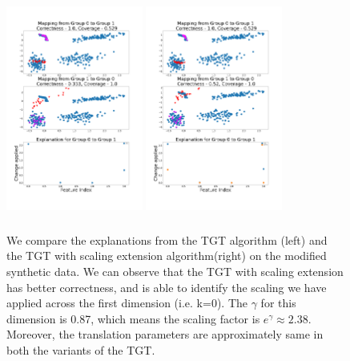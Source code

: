 \begin{figure}[H]
    \centering
    \includegraphics[width=0.4\textwidth, height=7.2cm]{../openreview/images/synthetic/synthetic_modified.png}
    \includegraphics[width=0.4\textwidth, height=7.2cm]{../openreview/images/synthetic/synthetic_modified_scaling.png}
    \caption{We compare the explanations from the TGT algorithm (left) and the TGT with scaling extension algorithm(right) on the modified synthetic data. We can observe that the TGT with scaling extension has better correctness, and is able to identify the scaling we have applied across the first dimension (i.e. k=0). The $\gamma$ for this dimension is 0.87, which means the scaling factor is $e^{\gamma} \approx 2.38$. Moreover, the translation parameters are approximately same in both the variants of the TGT. }
    \label{fig:synth_modified_change}
\end{figure}
\newpage
